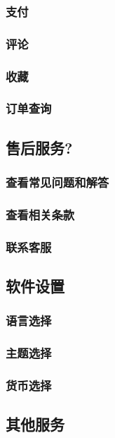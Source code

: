 \documentclass[11pt]{article}
\begin{document}
		\subsubsection{支付}
		\subsubsection{评论}
		\subsubsection{收藏}
		\subsubsection{订单查询}
	
	\subsection{售后服务?}
		\subsubsection{查看常见问题和解答}
		\subsubsection{查看相关条款}
		\subsubsection{联系客服}
	\subsection{软件设置}
		\subsubsection{语言选择}
		\subsubsection{主题选择}
		\subsubsection{货币选择}
	\subsection{其他服务}
\end{document}
